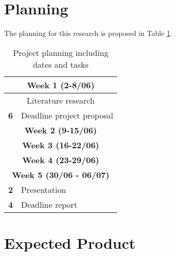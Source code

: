 \documentclass[a4paper,8pt]{article}
\begin{document}
\section*{Planning}
The planning for this research is proposed in Table \ref{table:planning}.

\begin{table}[H]
\small
\caption{Project planning including dates and tasks}
\label{table:planning}
\begin{tabular}{|l|l|}

\hline
\multicolumn{2}{|c|}{\textbf{Week 1 (2-8/06)}}\\
\hline
\multicolumn{2}{|c|}{Literature research}\\
\hline
\textbf{6} & Deadline project proposal\\ 
\hline
\multicolumn{2}{|c|}{\textbf{Week 2 (9-15/06)}}\\
\hline

\multicolumn{2}{|c|}{\textbf{Week 3 (16-22/06)}}\\
\hline

\multicolumn{2}{|c|}{\textbf{Week 4 (23-29/06)}}\\
\hline
\multicolumn{2}{|c|}{\textbf{Week 5 (30/06 - 06/07)}}\\
\hline
\textbf{2} & Presentation\\
\textbf{4} & Deadline report\\
\hline

\hline
\end{tabular}
\end{table}

\section*{Expected Product}



\pagebreak

{}

\end{document}
